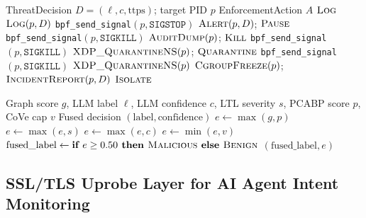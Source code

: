 \documentclass[journal]{IEEEtran}
\begin{document}
\begin{algorithm}[!t]
\caption{Confidence-Weighted Adaptive Enforcement (CWAE)}\label{alg:enforce}
\footnotesize
\begin{algorithmic}[1]
\Require ThreatDecision $D = (\ell, c, \text{ttps})$; target PID $p$
\Ensure EnforcementAction $A$
  \Return $\textsc{Log}$ \EndIf
{} \Return $\textsc{Log}(p, D)$ \EndIf
{}
  \State \texttt{bpf\_send\_signal}$(p, \texttt{SIGSTOP})$
  \State $\textsc{Alert}(p, D)$;\; \Return $\textsc{Pause}$
\EndIf
{}
  \State \texttt{bpf\_send\_signal}$(p, \texttt{SIGKILL})$
  \State $\textsc{AuditDump}(p)$;\; \Return $\textsc{Kill}$
\EndIf
{}
  \State \texttt{bpf\_send\_signal}$(p, \texttt{SIGKILL})$
  \State $\textsc{XDP\_QuarantineNS}(p)$;\; \Return $\textsc{Quarantine}$
\EndIf
\State \texttt{bpf\_send\_signal}$(p, \texttt{SIGKILL})$
\State $\textsc{XDP\_QuarantineNS}(p)$
\State $\textsc{CgroupFreeze}(p)$;\; $\textsc{IncidentReport}(p, D)$
\Return $\textsc{Isolate}$
\end{algorithmic}
\end{algorithm}

\begin{algorithm}[!t]
\caption{Score Fusion}\label{alg:fusion}
\footnotesize
\begin{algorithmic}[1]
\Require Graph score $g$, LLM label $\ell$, LLM confidence $c$, LTL severity $s$, PCABP score $p$, CoVe cap $v$
\Ensure Fused decision $(\text{label}, \text{confidence})$
\State $e \gets \max(g, p)$ 
  \State $e \gets \max(e, s)$ 
\EndIf
{}
  \State $e \gets \max(e, c)$ 
\EndIf
{}
  \State $e \gets \min(e, v)$ 
\EndIf
\State $\text{fused\_label} \gets \textbf{if } e \geq 0.50 \textbf{ then } \textsc{Malicious} \textbf{ else } \textsc{Benign}$
\Return $(\text{fused\_label}, e)$
\end{algorithmic}
\end{algorithm}

\subsection{SSL/TLS Uprobe Layer for AI Agent Intent Monitoring}
\label{sec:tls}
\end{document}
